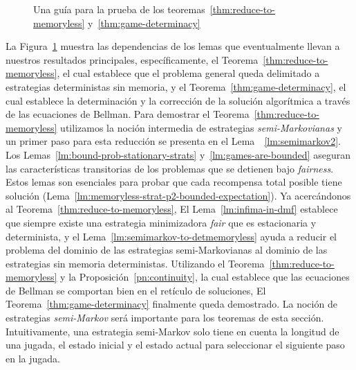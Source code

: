 \begin{figure}
{
  }
  \caption{Una guía para la prueba de los teoremas~\ref{thm:reduce-to-memoryless} y~\ref{thm:game-determinacy}}\label{fig:roadmap}
\end{figure}


La Figura~\ref{fig:roadmap} muestra las dependencias de los lemas que eventualmente llevan a nuestros resultados principales, específicamente, el Teorema~\ref{thm:reduce-to-memoryless}, el cual establece que el problema general queda delimitado a estrategias deterministas sin memoria, y el Teorema~\ref{thm:game-determinacy}, el cual establece la determinación y la corrección de la solución algorítmica a través de las ecuaciones de Bellman.
Para demostrar el Teorema~\ref{thm:reduce-to-memoryless} utilizamos la noción intermedia de estrategias \emph{semi-Markovianas} \cite{FilarV96} y un primer paso para esta reducción se presenta en el Lema~~\ref{lm:semimarkov2}.
Los Lemas~\ref{lm:bound-prob-stationary-strats}
y~\ref{lm:games-are-bounded} aseguran las características transitorias de los problemas que se detienen bajo \textit{fairness}.  Estos lemas son esenciales para probar que cada recompensa total posible tiene solución
(Lema~\ref{lm:memoryless-strat-p2-bounded-expectation}).  Ya acercándonos al Teorema~\ref{thm:reduce-to-memoryless},
El Lema~\ref{lm:infima-in-dmf} establece que siempre existe una estrategia minimizadora \textit{fair} que es estacionaria y determinista, y
el Lema~\ref{lm:semimarkov-to-detmemoryless} ayuda a reducir el problema del dominio de las estrategias semi-Markovianas al dominio de las estrategias sin memoria deterministas.  Utilizando el Teorema~\ref{thm:reduce-to-memoryless}
y la Proposición~\ref{pn:continuity}, la cual establece que las ecuaciones de Bellman se comportan bien en el retículo de soluciones,
El Teorema~\ref{thm:game-determinacy} finalmente queda demostrado.
La noción de estrategias \emph{semi-Markov} \cite{FilarV96} será importante para los teoremas de esta sección. Intuitivamente, una estrategia semi-Markov solo tiene en cuenta la longitud de una jugada, el estado inicial y el estado actual para seleccionar el siguiente paso en la jugada.
        

